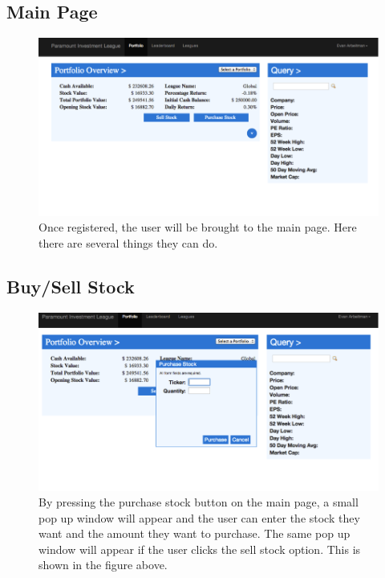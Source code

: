 \subsection{Main Page}
\begin{figure}[H]
\centering
\includegraphics[width=5.5in]{./img/ui/3.png}
\caption{Once registered, the user will be brought to the main page. Here there are several things they can do.}
\end{figure}

\subsection{Buy/Sell Stock}
\begin{figure}[H]
\centering
\includegraphics[width=5.5in]{./img/ui/4.png}
\caption{By pressing the purchase stock button on the main page, a small pop up window will appear and the user can enter the stock they want and the amount they want to purchase. The same pop up window will appear if the user clicks the sell stock option. This is shown in the figure above.}
\end{figure}

